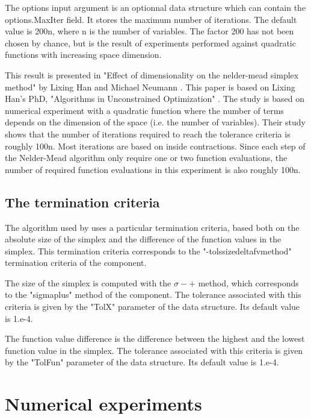 The options input argument is an optionnal data structure which can 
contain the options.MaxIter field. It stores the maximum number of 
iterations. The default value is 200n, where n is the number of 
variables. The factor 200 has not been chosen by chance, but is the 
result of experiments performed against quadratic functions with 
increasing space dimension.

This result is presented in "Effect of dimensionality on the nelder-mead 
simplex method" by Lixing Han and Michael Neumann \cite{HanNeumann2006}. This paper is based 
on Lixing Han's PhD, "Algorithms in Unconstrained Optimization" \cite{Han2000}. The 
study is based on numerical experiment with a quadratic function where 
the number of terms depends on the dimension of the space (i.e. the 
number of variables). Their study shows that the number of iterations 
required to reach the tolerance criteria is roughly 100n. Most 
iterations are based on inside contractions. Since each step of the 
Nelder-Mead algorithm only require one or two function evaluations, the 
number of required function evaluations in this experiment is also 
roughly 100n.

\subsection{The termination criteria}

The algorithm used by  uses a particular 
termination criteria, based both on the absolute size of the 
simplex and the difference of the function values in the simplex.
This termination criteria corresponds to the "-tolssizedeltafvmethod"
termination criteria of the  component.

The size of the simplex is computed with the $\sigma-+$ method,
which corresponds to the "sigmaplus" method of the 
component. The tolerance associated with this criteria is 
given by the "TolX" parameter of the  data structure.
Its default value is 1.e-4.

The function value difference is the difference 
between the highest and the lowest function value in the simplex.
The tolerance associated with this criteria is given by the 
"TolFun" parameter of the  data structure.
Its default value is 1.e-4.

\section{Numerical experiments}

